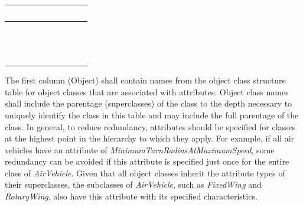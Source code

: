 {\begin{tabular}{|c|c|c|c|c|c|c|c|c|c|}
        &    &    &                  &                  &    &    &    &  &  \\
        \hline
                         &    &    &                  &                  &    &    &    &  &  \\
        &    &    &                  &                  &    &    &    &  &  \\
        &    &    &                  &                  &    &    &    &  &  \\
        \hline
    \end{tabular}%
}
\endgroup

The first column (Object) shall contain names from the object class structure table for object classes that are associated with attributes. Object class names shall include the parentage (superclasses) of the class to the depth necessary to uniquely identify the class in this table and may include the full parentage of the class. In general, to reduce redundancy, attributes should be specified for classes at the highest point in the hierarchy to which they apply. For example, if all air vehicles have an attribute of \textit{MinimumTurnRadiusAtMaximumSpeed}, some redundancy can be avoided if this attribute is specified just once for the entire class of \textit{AirVehicle}. Given that all object classes inherit the attribute types of their superclasses, the subclasses of \textit{AirVehicle}, such as \textit{FixedWing} and \textit{RotaryWing}, also have this attribute with its specified characteristics.

